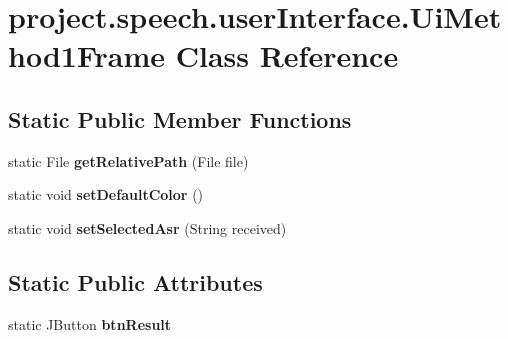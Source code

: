 \section{project.\+speech.\+user\+Interface.\+Ui\+Method1\+Frame Class Reference}
\label{classproject_1_1speech_1_1user_interface_1_1_ui_method1_frame}
\subsection*{Static Public Member Functions}
\begin{DoxyCompactItemize}
\item 
static File {\bf get\+Relative\+Path} (File file)
\item 
static void {\bf set\+Default\+Color} ()
\item 
static void {\bf set\+Selected\+Asr} (String received)
\end{DoxyCompactItemize}
\subsection*{Static Public Attributes}
\begin{DoxyCompactItemize}
\item 
static J\+Button {\bf btn\+Result}
\end{DoxyCompactItemize}
